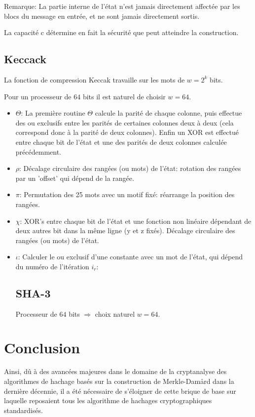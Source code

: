 \documentclass[10.5pt, a4paper, twoside, openright]{report}
\begin{document}
Remarque: La partie interne de l'état n'est jamais directement affectée par les blocs du message en entrée, et ne sont jamais directement sortis.

La capacité c détermine en fait la sécurité que peut atteindre la construction. 


\section{Keccack}
La fonction de compression Keccak travaille sur les mots de $w=2^k$ bits.

Pour un processeur de $64$ bits il est naturel de choisir $w=64$.
\begin{itemize}
\item{$\Theta$:
La première routine $\Theta$ calcule la parité de chaque colonne, puis effectue des ou exclusifs entre les parités de certaines colonnes deux à deux (cela correspond donc à la parité de deux colonnes).
Enfin un XOR est effectué entre chaque bit de l'état et une des parités de deux colonnes calculée précédemment. 
}

\item{$\rho$: 
Décalage circulaire des rangées (ou mots) de l'état: rotation des rangées par un 'offset' qui dépend de la rangée.}
\item{$\pi$: 
Permutation des 25 mots avec un motif fixé: réarrange la position des rangées.}
\item{$\chi$: 
XOR's entre chaque bit de l'état et une fonction non linéaire dépendant de deux autres bit dans la même ligne (y et z fixés).
Décalage circulaire des rangées (ou mots) de l'état.}
\item{$\iota$:
Calculer le ou exclusif d’une constante avec un mot de l’état, qui dépend du numéro de l’itération $i_r$:}

\section{SHA-3}
  Processeur de $64$ bits $\Rightarrow$ choix naturel $w=64$.
\end{itemize}
\chapter{Conclusion}

Ainsi, dû à des avancées majeures dans le domaine de la cryptanalyse des algorithmes de hachage basés sur la construction de Merkle-Dam\r{a}rd dans la dernière décennie, il a été nécessaire de s'éloigner de cette brique de base sur laquelle reposaient tous les algorithme de hachages cryptographiques standardisés.
\end{document}
